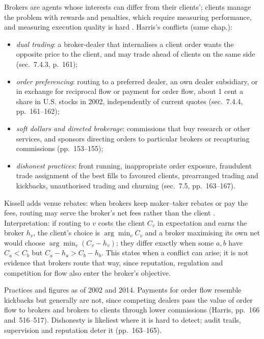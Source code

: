 \begin{qfdefinition}\label{def:broker-agency-conflicts}
 Brokers are agents whose interests can differ from their clients'; clients manage the problem with rewards and penalties, which require measuring performance, and measuring execution quality is hard \citep[chap.~``Brokers'', secs.~7.4--7.4.1, pp.~159--160]{alpha-harris}. Harris's conflicts (same chap.):
\begin{itemize}
\item \emph{dual trading}: a broker-dealer that internalises a client order wants the opposite price to the client, and may trade ahead of clients on the same side (sec.~7.4.3, p.~161);
\item \emph{order preferencing}: routing to a preferred dealer, an own dealer subsidiary, or in exchange for reciprocal flow or payment for order flow, about 1 cent a share in U.S. stocks in 2002, independently of current quotes (sec.~7.4.4, pp.~161--162);
\item \emph{soft dollars and directed brokerage}: commissions that buy research or other services, and sponsors directing orders to particular brokers or recapturing commissions (pp.~153--155);
\item \emph{dishonest practices}: front running, inappropriate order exposure, fraudulent trade assignment of the best fills to favoured clients, prearranged trading and kickbacks, unauthorised trading and churning (sec.~7.5, pp.~163--167).
\end{itemize}
Kissell adds venue rebates: when brokers keep maker--taker rebates or pay the fees, routing may serve the broker's net fees rather than the client \citep[chap.~3, p.~90]{s7-kissellscience}. Interpretation: if routing to $v$ costs the client $C_v$ in expectation and earns the broker $h_v$, the client's choice is $\arg\min_vC_v$ and a broker maximising its own net would choose $\arg\min_v(C_v-h_v)$; they differ exactly when some $a,b$ have $C_a<C_b$ but $C_a-h_a>C_b-h_b$. This states when a conflict can arise; it is not evidence that brokers route that way, since reputation, regulation and competition for flow also enter the broker's objective.

 Practices and figures as of 2002 and 2014. Payments for order flow resemble kickbacks but generally are not, since competing dealers pass the value of order flow to brokers and brokers to clients through lower commissions (Harris, pp.~166 and~516--517). Dishonesty is likeliest where it is hard to detect; audit trails, supervision and reputation deter it (pp.~163--165).


\end{qfdefinition}
